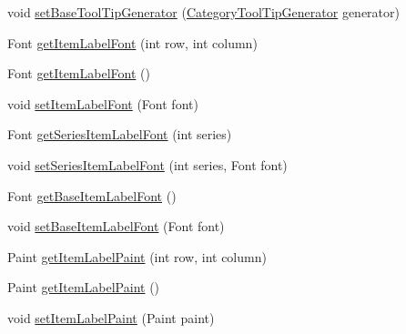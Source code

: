 \begin{DoxyCompactItemize}
\item 
void \mbox{\hyperlink{interfaceorg_1_1jfree_1_1chart_1_1renderer_1_1category_1_1_category_item_renderer_a8278a41153ebf3551e122550476ab646}{set\+Base\+Tool\+Tip\+Generator}} (\mbox{\hyperlink{interfaceorg_1_1jfree_1_1chart_1_1labels_1_1_category_tool_tip_generator}{Category\+Tool\+Tip\+Generator}} generator)
\item 
Font \mbox{\hyperlink{interfaceorg_1_1jfree_1_1chart_1_1renderer_1_1category_1_1_category_item_renderer_a3749a750524b7d0c97c07f635ebafad8}{get\+Item\+Label\+Font}} (int row, int column)
\item 
Font \mbox{\hyperlink{interfaceorg_1_1jfree_1_1chart_1_1renderer_1_1category_1_1_category_item_renderer_a36c3078748754f413db77717d6769872}{get\+Item\+Label\+Font}} ()
\item 
void \mbox{\hyperlink{interfaceorg_1_1jfree_1_1chart_1_1renderer_1_1category_1_1_category_item_renderer_a685e145a5b47946554cc764973ace150}{set\+Item\+Label\+Font}} (Font font)
\item 
Font \mbox{\hyperlink{interfaceorg_1_1jfree_1_1chart_1_1renderer_1_1category_1_1_category_item_renderer_a7e2dd43c2b47d951c69a365266cdc281}{get\+Series\+Item\+Label\+Font}} (int series)
\item 
void \mbox{\hyperlink{interfaceorg_1_1jfree_1_1chart_1_1renderer_1_1category_1_1_category_item_renderer_a6db6cbca30485a625bac7dec9e6e00a0}{set\+Series\+Item\+Label\+Font}} (int series, Font font)
\item 
Font \mbox{\hyperlink{interfaceorg_1_1jfree_1_1chart_1_1renderer_1_1category_1_1_category_item_renderer_a4383cfd603df36a6ca4b5f02c5ca6f48}{get\+Base\+Item\+Label\+Font}} ()
\item 
void \mbox{\hyperlink{interfaceorg_1_1jfree_1_1chart_1_1renderer_1_1category_1_1_category_item_renderer_a46c3636001b01498f6f222a4cbc6878e}{set\+Base\+Item\+Label\+Font}} (Font font)
\item 
Paint \mbox{\hyperlink{interfaceorg_1_1jfree_1_1chart_1_1renderer_1_1category_1_1_category_item_renderer_a6dc09b23062ace26315b23d97263871e}{get\+Item\+Label\+Paint}} (int row, int column)
\item 
Paint \mbox{\hyperlink{interfaceorg_1_1jfree_1_1chart_1_1renderer_1_1category_1_1_category_item_renderer_a78f5ae7abb9e7c55826dc6009ceb7839}{get\+Item\+Label\+Paint}} ()
\item 
void \mbox{\hyperlink{interfaceorg_1_1jfree_1_1chart_1_1renderer_1_1category_1_1_category_item_renderer_aac3a93a3b766677b28bcb79d233a498b}{set\+Item\+Label\+Paint}} (Paint paint)

\end{DoxyCompactItemize}
